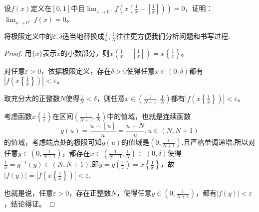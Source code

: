 \documentclass[../../main.tex]{subfiles}%
\begin{document}
\begin{example}
设\(f(x)\)定义在\([0,1]\)中且\(\lim_{x\rightarrow0^{+}}f\left(x\left(\frac{1}{x}-\left[\frac{1}{x}\right]\right)\right)=0\)，证明：\(\lim_{x\rightarrow0^{+}}f(x)=0\)。
\end{example}
\begin{note}
将极限定义中的$\varepsilon,\delta$适当地替换成$\frac{1}{n},\frac{1}{N}$往往更方便我们分析问题和书写过程.
\end{note}
\begin{proof}
用\(\{x\}\)表示\(x\)的小数部分，则\(x\left(\frac{1}{x}-\left[\frac{1}{x}\right]\right)=x\left\{\frac{1}{x}\right\}\)。

对任意\(\varepsilon>0\)，依据极限定义，存在\(\delta>0\)使得任意\(x\in(0,\delta)\)都有\(\left|f\left(x\left\{\frac{1}{x}\right\}\right)\right|<\varepsilon\)。

取充分大的正整数\(N\)使得\(\frac{1}{N}<\delta\)，则任意\(x\in\left(\frac{1}{N + 1},\frac{1}{N}\right)\)都有\(\left|f\left(x\left\{\frac{1}{x}\right\}\right)\right|<\varepsilon\)。

考虑函数\(x\left\{\frac{1}{x}\right\}\)在区间\(\left(\frac{1}{N + 1},\frac{1}{N}\right)\)中的值域，也就是连续函数
\[g(u)=\frac{u - [u]}{u}=\frac{u - N}{u},u\in(N,N + 1)\]
的值域，考虑端点处的极限可知\(g(u)\)的值域是\(\left(0,\frac{1}{N + 1}\right)\),且严格单调递增.所以对任意\(y\in\left(0,\frac{1}{N + 1}\right)\)，都存在\(x\in\left(\frac{1}{N + 1},\frac{1}{N}\right)\subset(0,\delta)\)使得$\frac{1}{x}=g^{-1}(y)\in(N,N+1)$,即\(y =g(\frac{1}{x})= x\left\{\frac{1}{x}\right\}\)，故\(|f(y)|=\left|f\left(x\left\{\frac{1}{x}\right\}\right)\right|<\varepsilon\).

也就是说，任意\(\varepsilon>0\)，存在正整数\(N\)，使得任意\(y\in\left(0,\frac{1}{N + 1}\right)\)，都有\(|f(y)|<\varepsilon\)，结论得证。
\end{proof}
\end{document}
